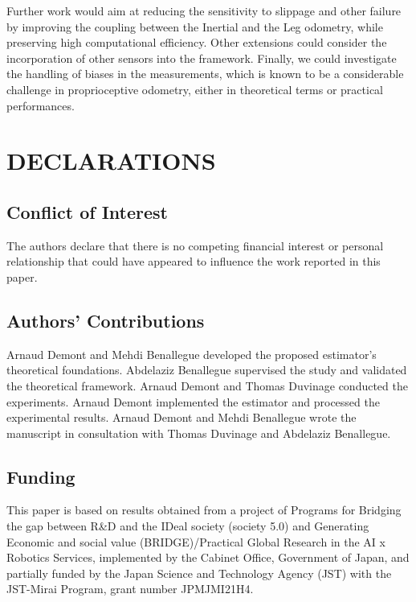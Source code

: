 \documentclass{IJCAS}
\begin{document}
Further work would aim at reducing the sensitivity to slippage and other failure by improving the coupling between the Inertial and the Leg odometry, while preserving high computational efficiency. Other extensions could consider the incorporation of other sensors into the framework. Finally, we could investigate the handling of biases in the measurements, which is known to be a considerable challenge in proprioceptive odometry, either in theoretical terms or practical performances.



\section*{DECLARATIONS}

\subsection*{Conflict of Interest }
The authors declare that there is no competing financial interest or personal relationship that could have appeared to influence the work reported in this paper.

\subsection*{Authors' Contributions}
Arnaud Demont and Mehdi Benallegue developed the proposed estimator's theoretical foundations. Abdelaziz Benallegue supervised the study and validated the theoretical framework. Arnaud Demont and Thomas Duvinage conducted the experiments. Arnaud Demont implemented the estimator and processed the experimental results. Arnaud Demont and Mehdi Benallegue wrote the manuscript in consultation with Thomas Duvinage and Abdelaziz Benallegue.

\subsection*{Funding }
This paper is based on results obtained from a project of Programs for Bridging the gap between R\&D and the IDeal society (society 5.0) and Generating Economic and social value (BRIDGE)/Practical Global Research in the AI x Robotics Services, implemented by the Cabinet Office, Government of Japan, and partially funded by the Japan Science and Technology Agency (JST) with the JST-Mirai Program, grant number JPMJMI21H4.


% 
% 
\end{document}

